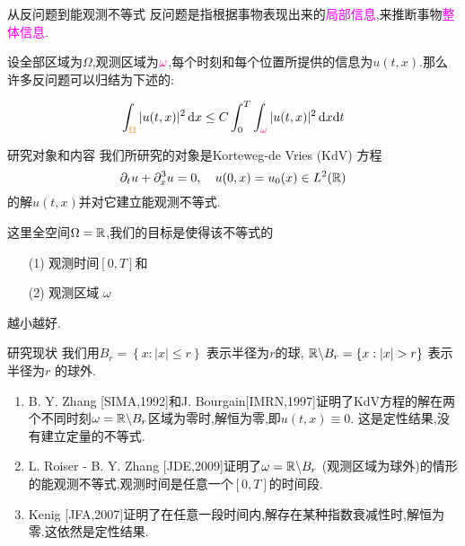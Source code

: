 \begin{frame}{从反问题到能观测不等式}
  反问题是指根据事物表现出来的\textcolor{magenta}{局部信息},来推断事物\textcolor{magenta}{整体信息}.
  \begin{figure}
  \end{figure}
  设全部区域为${\Omega}$,观测区域为$\color{magenta}{\omega}$,每个时刻和每个位置所提供的信息为$u(t,x)$.那么许多反问题可以归结为下述的\color{red}{能观测不等式}:
  \begin{block}{}
     \[
       \int_{\color{orange}{\Omega}}|u(t,x)|^2\, \mathrm{d}x\le C \int_{0}^{T}\int_{\color{magenta}{\omega}}|u(t,x)|^2\,\mathrm{d}x\mathrm{d}t
     \] 
   \end{block} 
\end{frame}
\begin{frame}{研究对象和内容}
  我们所研究的对象是Korteweg-de Vries (KdV) 方程
  \[
    \partial_t u+\partial_{x}^{3}u=0,\quad u(0,x)=u_0(x) \in L^2(\mathbb{R})
  \] 
  的解$u(t,x)$并对它建立能观测不等式. 
  
  这里全空间$\Omega=\mathbb{R}$,我们的目标是使得该不等式的
  \begin{itemize}
    \item[(1)] 观测时间$[0,T]$和
    \item[(2)] 观测区域 $\omega$
  \end{itemize}
  越小越好.
\end{frame}
\begin{frame}{研究现状}
  我们用$B_r=\left\{x:|x|\le r\right\} $ 表示半径为$r$的球,  $\R\backslash B_r=\left\{x:|x|>r\right\} $ 表示半径为$r$ 的球外.
  \begin{enumerate}
    \item B. Y. Zhang [SIMA,1992]和J. Bourgain[IMRN,1997]证明了KdV方程的解在两个不同时刻$\omega=\mathbb{R} \backslash  B_r$区域为零时,解恒为零,即$u(t,x)\equiv 0$. 这是定性结果,没有建立定量的不等式.
    \item L. Roiser - B. Y. Zhang [JDE,2009]证明了$\omega=\mathbb{R} \backslash B_r$ (观测区域为球外)的情形的能观测不等式,观测时间是任意一个$[0,T]$的时间段.
    \item Kenig [JFA,2007]证明了在任意一段时间内,解存在某种指数衰减性时,解恒为零.这依然是定性结果.
  \end{enumerate}
\end{frame}
